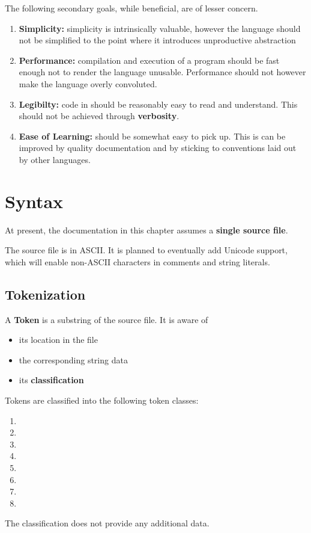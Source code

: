 \documentclass{article}
\begin{document}
\begin{samepage}
    
The following secondary goals, while beneficial, are of lesser concern.
\begin{enumerate}
    \setcounter{enumi}{\therememberEnumi}
    \item {\bf Simplicity:} simplicity is intrinsically valuable,
    however the language should not be simplified to the point
    where it introduces unproductive abstraction
    \item {\bf Performance:} compilation and execution of a
    \lazydog program should be fast enough not to render
    the language unusable. Performance should not however
    make the language overly convoluted.
    \item {\bf Legibilty:} code in \lazydog should
    be reasonably easy to read and understand.
    This should not be achieved through {\bf verbosity}.
    \item {\bf Ease of Learning:} \lazydog should be somewhat
    easy to pick up. 
    This is can be improved by quality documentation
    and by sticking to conventions laid out by other languages.
\end{enumerate}
\end{samepage}


\section{Syntax}
At present, the documentation in this chapter assumes
a {\bf single source file}.

The source file is in ASCII. It is planned to eventually add Unicode
support, which will enable non-ASCII characters in comments and string literals.

\subsection{Tokenization}
A {\bf Token} is a substring of the source file.
It is aware of 
\begin{itemize}
    \item its location in the file
    \item the corresponding string data
    \item its {\bf classification}
\end{itemize}

Tokens are classified into the following token classes:
\begin{enumerate}
    \item \tcom
    \item \tident
    \item \ttrait
    \item \tsym
    \item \tint
    \item \tfl
    \item \tstr
    \item \tinv
\end{enumerate}
The classification does not provide any additional data.
\end{document}
